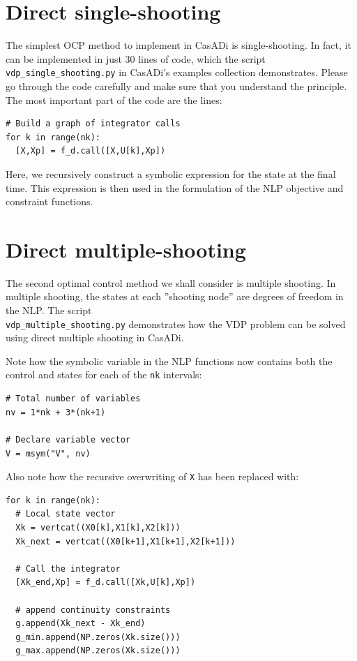 \documentclass[a4paper,12pt]{book}
\begin{document}
{\section{Direct single-shooting}
The simplest OCP method to implement in CasADi is single-shooting. In fact, it can be implemented in just 30 lines of code, which the script {\texttt{vdp\_single\_shooting.py}} in CasADi's examples collection demonstrates. Please go through the code carefully and make sure that you understand the principle. The most important part of the code are the lines:
\begin{verbatim}
# Build a graph of integrator calls
for k in range(nk):
  [X,Xp] = f_d.call([X,U[k],Xp])
\end{verbatim}

Here, we recursively construct a symbolic expression for the state at the final time. This expression is then used in the formulation of the NLP objective and constraint functions.

\section{Direct multiple-shooting}
The second optimal control method we shall consider is multiple shooting. In multiple shooting, the states at each ''shooting node'' are degrees of freedom in the NLP. The script \\ \texttt{vdp\_multiple\_shooting.py} demonstrates how the VDP problem can be solved using direct multiple shooting in CasADi.

Note how the symbolic variable in the NLP functions now contains both the control and states for each of the \texttt{nk} intervals:
\begin{verbatim}
# Total number of variables
nv = 1*nk + 3*(nk+1)

# Declare variable vector
V = msym("V", nv)
\end{verbatim}

Also note how the recursive overwriting of \texttt{X} has been replaced with:
\begin{verbatim}
for k in range(nk):
  # Local state vector
  Xk = vertcat((X0[k],X1[k],X2[k]))
  Xk_next = vertcat((X0[k+1],X1[k+1],X2[k+1]))
  
  # Call the integrator
  [Xk_end,Xp] = f_d.call([Xk,U[k],Xp])
  
  # append continuity constraints
  g.append(Xk_next - Xk_end)
  g_min.append(NP.zeros(Xk.size()))
  g_max.append(NP.zeros(Xk.size()))
\end{verbatim}

}
\end{document}
